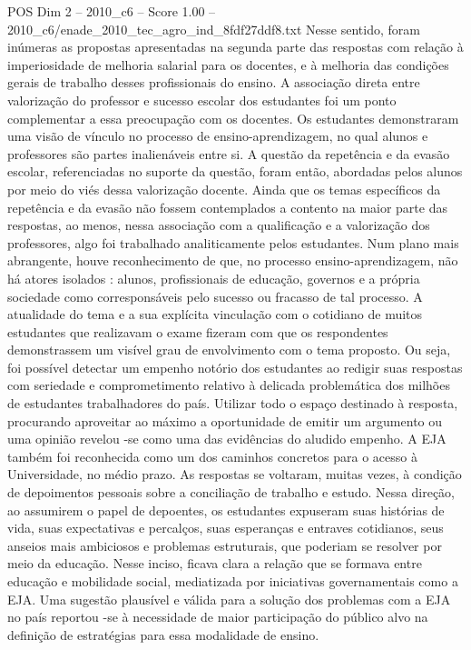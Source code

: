 \begin{textsample}{POS Dim 2 – 2010\_c6 – Score 1.00 – 2010\_c6/enade\_2010\_tec\_agro\_ind\_8fdf27ddf8.txt}
Nesse sentido, foram inúmeras as propostas apresentadas na segunda parte das respostas com relação à imperiosidade de melhoria salarial para os docentes, e à melhoria das condições gerais de trabalho desses profissionais do ensino.
A associação direta entre valorização do professor e sucesso escolar dos estudantes foi um ponto complementar a essa preocupação com os docentes.
Os estudantes demonstraram uma visão de vínculo no processo de ensino-aprendizagem, no qual alunos e professores são partes inalienáveis entre si.
A questão da repetência e da evasão escolar, referenciadas no suporte da questão, foram então, abordadas pelos alunos por meio do viés dessa valorização docente.
Ainda que os temas específicos da repetência e da evasão não fossem contemplados a contento na maior parte das respostas, ao menos, nessa associação com a qualificação e a valorização dos professores, algo foi trabalhado analiticamente pelos estudantes.
Num plano mais abrangente, houve reconhecimento de que, no processo ensino-aprendizagem, não há atores isolados : alunos, profissionais de educação, governos e a própria sociedade como corresponsáveis pelo sucesso ou fracasso de tal processo.
A atualidade do tema e a sua explícita vinculação com o cotidiano de muitos estudantes que realizavam o exame fizeram com que os respondentes demonstrassem um visível grau de envolvimento com o tema proposto.
Ou seja, foi possível detectar um empenho notório dos estudantes ao redigir suas respostas com seriedade e comprometimento relativo à delicada problemática dos milhões de estudantes trabalhadores do país.
Utilizar todo o espaço destinado à resposta, procurando aproveitar ao máximo a oportunidade de emitir um argumento ou uma opinião revelou -se como uma das evidências do aludido empenho.
A EJA também foi reconhecida como um dos caminhos concretos para o acesso à Universidade, no médio prazo.
As respostas se voltaram, muitas vezes, à condição de depoimentos pessoais sobre a conciliação de trabalho e estudo.
Nessa direção, ao assumirem o papel de depoentes, os estudantes expuseram suas histórias de vida, suas expectativas e percalços, suas esperanças e entraves cotidianos, seus anseios mais ambiciosos e problemas estruturais, que poderiam se resolver por meio da educação.
Nesse inciso, ficava clara a relação que se formava entre educação e mobilidade social, mediatizada por iniciativas governamentais como a EJA.
Uma sugestão plausível e válida para a solução dos problemas com a EJA no país reportou -se à necessidade de maior participação do público alvo na definição de estratégias para essa modalidade de ensino.

\end{textsample}
